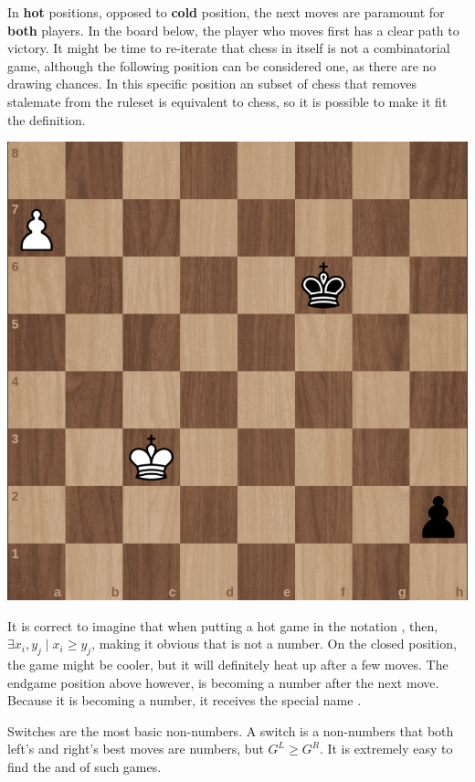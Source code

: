 In \textbf{hot} positions, opposed to \textbf{cold} position, the next moves are paramount for \textbf{both} players. In the board below, the player who moves first has a clear path to victory. It might be time to re-iterate that chess in itself is not a combinatorial game, although the following position can be considered one, as there are no drawing chances. In this specific position an subset of chess that removes stalemate from the ruleset is equivalent to chess, so it is possible to make it fit the definition.

\begin{center}
	\includegraphics[scale=0.15]{images/chess_hot} 
\end{center}

It is correct to imagine that when putting a hot game \Gm{} in the notation , then, $\exists x_i, y_j \mid x_i \ge y_j$, making it obvious that \Gm{} is not a number. On the closed position, the game might be cooler, but it will definitely heat up after a few moves. The endgame position above however, is becoming a number after the next move. Because it is becoming a number, it receives the special name .

Switches are the most basic non-numbers. A switch is a non-numbers \Gm{} that both left's and right's best moves are numbers, but $G^L \ge G^R$. It is extremely easy to find the  and  of such games. 

